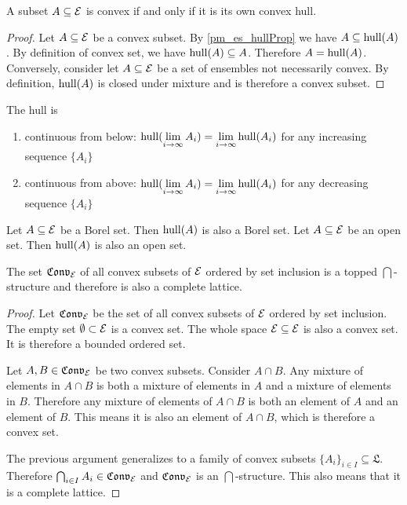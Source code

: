 \begin{coro}
	A subset $A \subseteq \mathcal{E}$ is convex if and only if it is its own convex hull.
\end{coro}

\begin{proof}
	Let $A \subseteq \mathcal{E}$ be a convex subset. By \ref{pm_es_hullProp} we have $A \subseteq \mathrm{hull}(A)$. By definition of convex set, we have $\mathrm{hull}(A) \subseteq A$. Therefore $A = \mathrm{hull}(A)$. Conversely, consider let $A \subseteq \mathcal{E}$ be a set of ensembles not necessarily convex. By definition, $\mathrm{hull}(A)$ is closed under mixture and is therefore a convex subset.
\end{proof}

\begin{conj}
	The hull is
	\begin{enumerate}
		\item continuous from below: $\mathrm{hull}(\lim\limits_{i \to \infty} A_i) = \lim\limits_{i \to \infty} \mathrm{hull}(A_i)$ for any increasing sequence $\{A_i\}$
		\item continuous from above: $\mathrm{hull}(\lim\limits_{i \to \infty} A_i) = \lim\limits_{i \to \infty} \mathrm{hull}(A_i)$ for any decreasing sequence $\{A_i\}$
	\end{enumerate}
\end{conj}

\begin{conj}
	Let $A \subseteq \mathcal{E}$ be a Borel set. Then $\mathrm{hull}(A)$ is also a Borel set. Let $A \subseteq \mathcal{E}$ be an open set. Then $\mathrm{hull}(A)$ is also an open set.
\end{conj}


\begin{coro}
	The set $\mathfrak{Conv}_{\mathcal{E}}$ of all convex subsets of $\mathcal{E}$ ordered by set inclusion is a topped $\bigcap$-structure and therefore is also a complete lattice.
\end{coro}

\begin{proof}
	Let $\mathfrak{Conv}_{\mathcal{E}}$ be the set of all convex subsets of $\mathcal{E}$ ordered by set inclusion. The empty set $\emptyset \subset \mathcal{E}$ is a convex set. The whole space $\mathcal{E} \subseteq \mathcal{E}$ is also a convex set. It is therefore a bounded ordered set.
	
	Let $A, B \in \mathfrak{Conv}_{\mathcal{E}}$ be two convex subsets. Consider $A \cap B$. Any mixture of elements in $A \cap B$ is both a mixture of elements in $A$ and a mixture of elements in $B$. Therefore any mixture of elements of $A \cap B$ is both an element of $A$ and an element of $B$. This means it is also an element of $A \cap B$, which is therefore a convex set.
	
	The previous argument generalizes to a family of convex subsets $\{A_i\}_{i \in I} \subseteq \mathfrak{L}$. Therefore $\bigcap_{i \in I} A_i \in \mathfrak{Conv}_{\mathcal{E}}$ and $\mathfrak{Conv}_{\mathcal{E}}$ is an $\bigcap$-structure. This also means that it is a complete lattice.
\end{proof}

